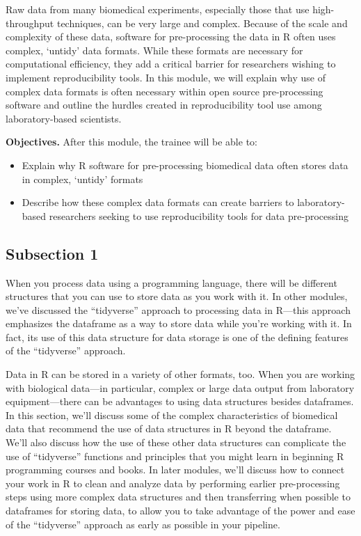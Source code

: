 \documentclass[]{tufte-book}
\providecommand{\tightlist}{%
  \setlength{\itemsep}{0pt}\setlength{\parskip}{0pt}}
\begin{document}
Raw data from many biomedical experiments, especially those that use
high-throughput techniques, can be very large and complex. Because of the scale
and complexity of these data, software for pre-processing the data in R often
uses complex, `untidy' data formats. While these formats are necessary for
computational efficiency, they add a critical barrier for researchers wishing to
implement reproducibility tools. In this module, we will explain why use of
complex data formats is often necessary within open source pre-processing
software and outline the hurdles created in reproducibility tool use among
laboratory-based scientists.

\textbf{Objectives.} After this module, the trainee will be able to:

\begin{itemize}
\tightlist
\item
  Explain why R software for pre-processing biomedical data often stores
  data in complex, `untidy' formats
\item
  Describe how these complex data formats can create barriers to
  laboratory-based researchers seeking to use reproducibility tools for
  data pre-processing
\end{itemize}

\hypertarget{subsection-1}{%
\subsection{Subsection 1}\label{subsection-1}}

When you process data using a programming language, there will be different
structures that you can use to store data as you work with it. In other modules,
we've discussed the ``tidyverse'' approach to processing data in R---this approach
emphasizes the dataframe as a way to store data while you're working with it.
In fact, its use of this data structure for data storage is one of the defining
features of the ``tidyverse'' approach.

Data in R can be stored in a variety of other formats, too. When you are working
with biological data---in particular, complex or large data output from laboratory
equipment---there can be advantages to using data structures besides dataframes.
In this section, we'll discuss some of the complex characteristics of biomedical
data that recommend the use of data structures in R beyond the dataframe. We'll
also discuss how the use of these other data structures can complicate the use of
``tidyverse'' functions and principles that you might learn in beginning R programming
courses and books. In later modules, we'll discuss how to connect your work in R
to clean and analyze data by performing earlier pre-processing steps using more
complex data structures and then transferring when possible to dataframes for
storing data, to allow you to take advantage of the power and ease of the
``tidyverse'' approach as early as possible in your pipeline.
\end{document}
